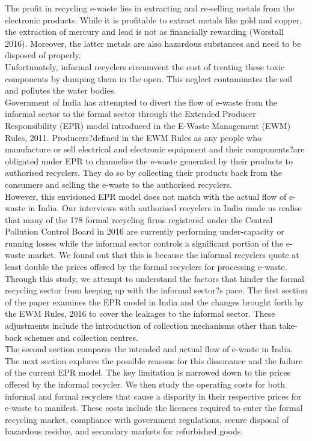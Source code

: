 \documentclass[a4paper, 12pt]{article}
\begin{document}
                    The profit in recycling e-waste lies in extracting and re-selling metals from the electronic products. While it is profitable to extract metals like gold and copper, the extraction of mercury and lead is not as financially rewarding (Worstall 2016). Moreover, the latter metals are also hazardous substances and need to be disposed of properly. \\
                    
                    Unfortunately, informal recyclers circumvent the cost of treating these toxic components by dumping them in the open. This neglect contaminates the soil and pollutes the water bodies.\\
                    
                    Government of India has attempted to divert the flow of e-waste from the informal sector to the formal sector through the Extended Producer Responsibility (EPR) model introduced in the E-Waste Management (EWM) Rules, 2011. Producers?defined in the EWM Rules as any people who manufacture or sell electrical and electronic equipment and their components?are obligated under EPR to channelise the e-waste generated by their products to authorised recyclers. They do so by collecting their products back from the consumers and selling the e-waste to the authorised recyclers.  \\
                    
                    However, this envisioned EPR model does not match with the actual flow of e-waste in India. Our interviews with authorised recyclers in India made us realise that many of the 178 formal recycling firms registered under the Central Pollution Control Board in 2016 are currently performing under-capacity or running losses while the informal sector controls a significant portion of the e-waste market. We found out that this is because the informal recyclers quote at least double the prices offered by the formal recyclers for processing e-waste. Through this study, we attempt to understand the factors that hinder the formal recycling sector from keeping up with the informal sector?s pace. 
                    The first section of the paper examines the EPR model in India and the changes brought forth by the EWM Rules, 2016 to cover the leakages to the informal sector. These adjustments include the introduction of collection mechanisms other than take-back schemes and collection centres. \\
                    
                    The second section compares the intended and actual flow of e-waste in India. The next section explores the possible reasons for this dissonance and the failure of the current EPR model. The key limitation is narrowed down to the prices offered by the informal recycler. We then study the operating costs for both informal and formal recyclers that cause a disparity in their respective prices for e-waste to manifest. These costs include the licences required to enter the formal recycling market, compliance with government regulations, secure disposal of hazardous residue, and secondary markets for refurbished goods. \\
                    
\end{document}
